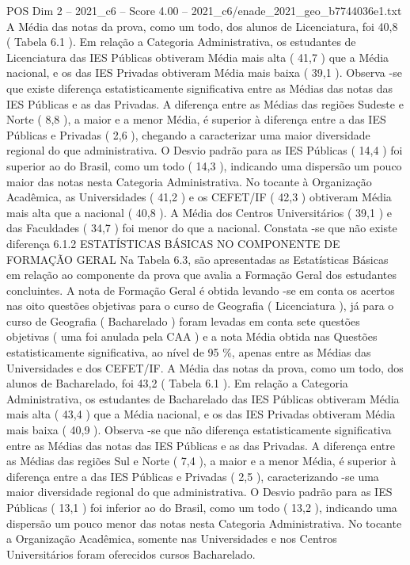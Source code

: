 \begin{textsample}{POS Dim 2 – 2021\_c6 – Score 4.00 – 2021\_c6/enade\_2021\_geo\_b7744036e1.txt}
A Média das notas da prova, como um todo, dos alunos de Licenciatura, foi 40,8 ( Tabela 6.1 ).
Em relação a Categoria Administrativa, os estudantes de Licenciatura das IES Públicas obtiveram Média mais alta ( 41,7 ) que a Média nacional, e os das IES Privadas obtiveram Média mais baixa ( 39,1 ).
Observa -se que existe diferença estatisticamente significativa entre as Médias das notas das IES Públicas e as das Privadas.
A diferença entre as Médias das regiões Sudeste e Norte ( 8,8 ), a maior e a menor Média, é superior à diferença entre a das IES Públicas e Privadas ( 2,6 ), chegando a caracterizar uma maior diversidade regional do que administrativa.
O Desvio padrão para as IES Públicas ( 14,4 ) foi superior ao do Brasil, como um todo ( 14,3 ), indicando uma dispersão um pouco maior das notas nesta Categoria Administrativa.
No tocante à Organização Acadêmica, as Universidades ( 41,2 ) e os CEFET/IF ( 42,3 ) obtiveram Média mais alta que a nacional ( 40,8 ).
A Média dos Centros Universitários ( 39,1 ) e das Faculdades ( 34,7 ) foi menor do que a nacional.
Constata -se que não existe diferença 6.1.2 ESTATÍSTICAS BÁSICAS NO COMPONENTE DE FORMAÇÃO GERAL Na Tabela 6.3, são apresentadas as Estatísticas Básicas em relação ao componente da prova que avalia a Formação Geral dos estudantes concluintes.
A nota de Formação Geral é obtida levando -se em conta os acertos nas oito questões objetivas para o curso de Geografia ( Licenciatura ), já para o curso de Geografia ( Bacharelado ) foram levadas em conta sete questões objetivas ( uma foi anulada pela CAA ) e a nota Média obtida nas Questões estatisticamente significativa, ao nível de 95 \%, apenas entre as Médias das Universidades e dos CEFET/IF.
A Média das notas da prova, como um todo, dos alunos de Bacharelado, foi 43,2 ( Tabela 6.1 ).
Em relação a Categoria Administrativa, os estudantes de Bacharelado das IES Públicas obtiveram Média mais alta ( 43,4 ) que a Média nacional, e os das IES Privadas obtiveram Média mais baixa ( 40,9 ).
Observa -se que não diferença estatisticamente significativa entre as Médias das notas das IES Públicas e as das Privadas.
A diferença entre as Médias das regiões Sul e Norte ( 7,4 ), a maior e a menor Média, é superior à diferença entre a das IES Públicas e Privadas ( 2,5 ), caracterizando -se uma maior diversidade regional do que administrativa.
O Desvio padrão para as IES Públicas ( 13,1 ) foi inferior ao do Brasil, como um todo ( 13,2 ), indicando uma dispersão um pouco menor das notas nesta Categoria Administrativa.
No tocante a Organização Acadêmica, somente nas Universidades e nos Centros Universitários foram oferecidos cursos Bacharelado.

\end{textsample}
